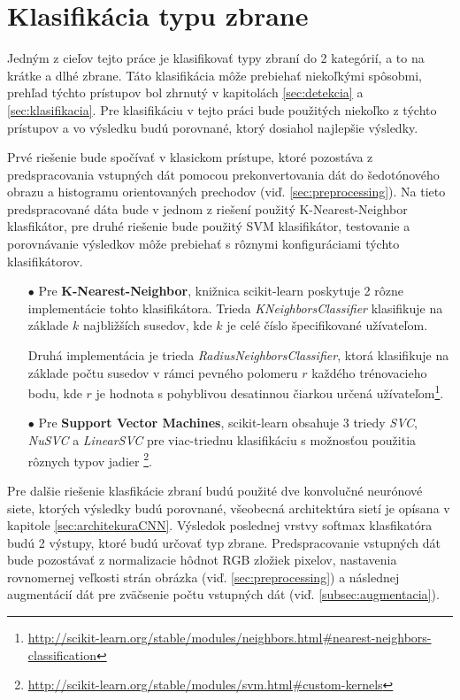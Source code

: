 
\section{Klasifikácia typu zbrane}
\label{sec:klasfikaciatypuzbrane}
Jedným z cieľov tejto práce je klasifikovať typy zbraní do 2 kategórií, a to na krátke a dlhé zbrane.
Táto klasifikácia môže prebiehať niekoľkými spôsobmi, prehľad týchto prístupov bol zhrnutý v kapitolách \ref{sec:detekcia} a \ref{sec:klasifikacia}.
Pre klasifikáciu v tejto práci bude použitých niekoľko z týchto prístupov a vo výsledku budú porovnané, ktorý dosiahol najlepšie výsledky.

Prvé riešenie bude spočívať v klasickom prístupe, ktoré pozostáva z predspracovania vstupných dát pomocou prekonvertovania dát do šedotónového obrazu a histogramu orientovaných prechodov (viď. \ref{sec:preprocessing}).
Na tieto predspracované dáta bude v jednom z riešení použitý K-Nearest-Neighbor klasfikátor, pre druhé riešenie bude použitý SVM klasifikátor, testovanie
    a porovnávanie výsledkov môže prebiehať s rôznymi konfiguráciami týchto klasifikátorov.
\begin{enumerate}
    \item[$\bullet$] Pre \textbf{K-Nearest-Neighbor}, knižnica scikit-learn poskytuje 2 rôzne implementácie tohto klasifikátora.
    Trieda \textit{KNeighborsClassifier} klasifikuje na základe $k$ najbližších susedov, kde $k$ je celé číslo špecifikované užívateľom.
    
    Druhá implementácia je trieda \textit{RadiusNeighborsClassifier}, ktorá klasifikuje na základe počtu susedov v rámci pevného polomeru $r$ každého trénovacieho bodu,
        kde $r$ je hodnota s pohyblivou desatinnou čiarkou určená užívateľom\footnote{\url{http://scikit-learn.org/stable/modules/neighbors.html\#nearest-neighbors-classification}}.
    \item[$\bullet$] Pre \textbf{Support Vector Machines}, scikit-learn obsahuje 3 triedy \textit{SVC}, \textit{NuSVC} a \textit{LinearSVC} pre viac-triednu
        klasifikáciu s možnosťou použitia rôznych typov jadier \footnote{\url{http://scikit-learn.org/stable/modules/svm.html\#custom-kernels}}.
\end{enumerate}

Pre dalšie riešenie klasfikácie zbraní budú použité dve konvolučné neurónové siete, ktorých výsledky budú porovnané, všeobecná architektúra sietí je opísana v kapitole \ref{sec:architekuraCNN}.
Výsledok poslednej vrstvy softmax klasfikatóra budú 2 výstupy, ktoré budú určovať typ zbrane.
Predspracovanie vstupných dát bude pozostávať z normalizacie hôdnot RGB zložiek pixelov, nastavenia rovnomernej veľkosti strán obrázka (viď. \ref{sec:preprocessing})
    a následnej augmentácií dát pre zväčsenie počtu vstupných dát (viď. \ref{subsec:augmentacia}).
